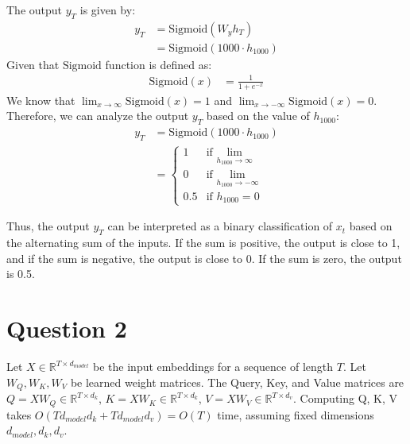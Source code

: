 \documentclass{article}
\begin{document}
The output $y_T$ is given by:
\begin{align*}
    y_T &= \text{Sigmoid}(W_y h_T)\\
    &= \text{Sigmoid}(1000 \cdot h_{1000})
\end{align*}
Given that $\text{Sigmoid}$ function is defined as:
\begin{align*}
    \text{Sigmoid}(x) &= \frac{1}{1 + e^{-x}}
\end{align*}
We know that $\lim_{x \to \infty} \text{Sigmoid}(x) = 1$ and $\lim_{x \to -\infty} \text{Sigmoid}(x) = 0$. Therefore, we can analyze the output $y_T$ based on the value of $h_{1000}$:
\begin{align*}
    y_T &= \text{Sigmoid}(1000 \cdot h_{1000})\\
    &= \begin{cases}
        1 & \text{if } \lim_{h_{1000} \to \infty}\\
        0 & \text{if } \lim_{h_{1000} \to -\infty}\\
        0.5 & \text{if } h_{1000} = 0
    \end{cases}
\end{align*}

Thus, the output $y_T$ can be interpreted as a binary classification of $x_t$ based on the alternating sum of the inputs. If the sum is positive, the output is close to 1, and if the sum is negative, the output is close to 0. If the sum is zero, the output is 0.5.

\section*{Question 2}
Let $X \in \mathbb{R}^{T \times d_{model}}$ be the input embeddings for a sequence of length $T$.
Let $W_Q, W_K, W_V$ be learned weight matrices.
The Query, Key, and Value matrices are $Q = XW_Q \in \mathbb{R}^{T \times d_k}$, $K = XW_K \in \mathbb{R}^{T \times d_k}$, $V = XW_V \in \mathbb{R}^{T \times d_v}$.
Computing Q, K, V takes $O(T d_{model} d_k + T d_{model} d_v) = O(T)$ time, assuming fixed dimensions $d_{model}, d_k, d_v$.
\end{document}
